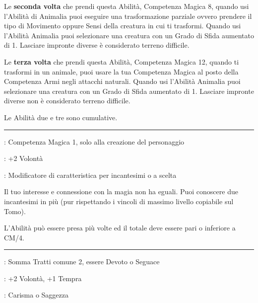 \begin{multicols}{2}
Le \textbf{seconda volta} che prendi questa Abilità, Competenza Magica 8, quando usi l'Abilità di Animalia puoi eseguire una trasformazione parziale ovvero prendere il tipo di Movimento oppure Sensi della creatura in cui ti trasformi. Quando usi l'Abilità Animalia puoi selezionare una creatura con un Grado di Sfida aumentato di 1. Lasciare impronte diverse è considerato terreno difficile.

Le \textbf{terza volta} che prendi questa Abilità, Competenza Magica 12, quando ti trasformi in un animale, puoi usare la tua Competenza Magica al posto della Competenza Armi negli attacchi naturali. Quando usi l'Abilità Animalia puoi selezionare una creatura con un Grado di Sfida aumentato di 1. Lasciare impronte diverse non è considerato terreno difficile.

Le Abilità due e tre sono cumulative.

\smallskip\noindent\rule{\linewidth}{2pt} \hypertarget{Sapiente}{}\medskip{}
\noindent
\begin{description}[noitemsep, topsep=0pt, parsep=0pt, partopsep=0pt, leftmargin=0cm, labelwidth=2.5cm]
    \item[\textbf{Requisito}]: Competenza Magica 1, solo alla creazione del personaggio
    \item[\textbf{Tiri Salvezza}]: +2 Volontà
    \item[\textbf{Caratteristica}]: Modificatore di caratteristica per incantesimi o a scelta
\end{description}

Il tuo interesse e connessione con la magia non ha eguali. Puoi conoscere due incantesimi in più (pur rispettando i vincoli di massimo livello copiabile sul Tomo).

L'Abilità può essere presa più volte ed il totale deve essere pari o inferiore a CM/4.

\smallskip\noindent\rule{\linewidth}{2pt} \hypertarget{Scacciare i non morti}{}\medskip{}
\noindent
\begin{description}[noitemsep, topsep=0pt, parsep=0pt, partopsep=0pt, leftmargin=0cm, labelwidth=2.5cm]
    \item[\textbf{Requisito}]: Somma Tratti comune 2, essere Devoto o Seguace
    \item[\textbf{Tiri Salvezza}]: +2 Volontà, +1 Tempra
    \item[\textbf{Caratteristica}]: Carisma o Saggezza
\end{description}


\end{multicols}
